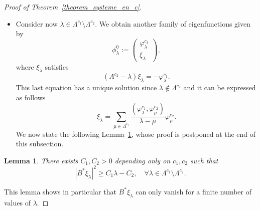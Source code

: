 \documentclass[11pt]{article}
\newtheorem{lemm}[theo]{Lemma}
\theoremstyle{definition}
\numberwithin{equation}{section}
\numberwithin{figure}{section}
\numberwithin{table}{section}
\newcommand{\fprop}[2]{\varphi^{#1}_{#2}}
\renewcommand{\cdot}{{\scriptstyle \bullet}}
\let\oldforall\forall
\renewcommand*{\forall}{\mathrel{\oldforall}}
\begin{document}
\begin{proof}[Proof of Theorem~\ref{theorem_systeme_en_c}]
\begin{itemize}
\begin{itemize}
\begin{itemize}
\item Assume now that $\beta_\lambda\neq 0$. In that case, $\lambda$ is geometrically simple but there exists a generalized eigenfunction $\phi_\lambda^1$ associated with $\phi_\lambda^0$ of the following form
\[
\phi_\lambda^1 := \frac{1}{\beta_\lambda}
\begin{pmatrix} \fprop{c_1}{\lambda} \\ \chi_\lambda
\end{pmatrix},
\]


where $\chi_\lambda$ is the unique solution of
\[
(A^{c_2} - \lambda) \chi_\lambda = \beta_\lambda \fprop{c_2}{\lambda} - \fprop{c_1}{\lambda},
\]
that satisfy $B^*\chi_\lambda=0$.

We can express $\chi_\lambda$ in the basis $\fprop{c_2}{\cdot}$ as follows
\[
\chi_\lambda=a_\lambda \fprop{c_2}{\lambda} - \sum_{\substack{\mu\in \Lambda^{c_2}\\ \mu \neq \lambda}} \frac{(\fprop{c_1}{\lambda},\fprop{c_2}{\mu})}{\lambda-\mu} \fprop{c_2}{\mu},
\]
with
\[
a_\lambda = \frac{1}{B^*\fprop{c_2}{\lambda}} \sum_{\substack{\mu\in \Lambda^{c_2}\\ \mu \neq \lambda}} \frac{(\fprop{c_1}{\lambda},\fprop{c_2}{\mu})}{\lambda-\mu} B^* \fprop{c_2}{\mu}.
\]
\end{itemize}
\end{itemize}
\item Consider now $\lambda\in \Lambda^{c_1}\setminus \Lambda^{c_2}$. We obtain another family of eigenfunctions given by
\begin{equation}\label{systeme_en_c_fp2}
\phi_\lambda^0 :=
\begin{pmatrix} \fprop{c_1}{\lambda} \\ \xi_\lambda
\end{pmatrix},
\end{equation}
where $\xi_\lambda$ satisfies
\[
(A^{c_2}-\lambda) \xi_\lambda = - \fprop{c_1}{\lambda}.
\]
This last equation has a unique solution since $\lambda\not\in \Lambda^{c_2}$ and it can be expressed as follows
\begin{equation}\label{def_xi_lambda}
\xi_\lambda = \sum_{\mu\in \Lambda^{c_2}} \frac{(\fprop{c_1}{\lambda},\fprop{c_2}{\mu})}{\lambda-\mu} \fprop{c_2}{\mu}.
\end{equation}
We now state the following Lemma~\ref{lemme_ABM}, whose proof is postponed at the end of this subsection.
\end{itemize}
\begin{lemm}\label{lemme_ABM}
There exists $C_1,C_2>0$ depending only on $c_1, c_2$ such that
\begin{equation}\label{ABM_xi_lambda}
|B^* \xi_\lambda|^2 \geq C_1 \lambda - C_2, \quad \forall \lambda\in \Lambda^{c_1}\setminus \Lambda^{c_2}.
\end{equation}
\end{lemm}
This lemma shows in particular that $B^* \xi_\lambda$ can only vanish for a finite number of values of $\lambda$.



\end{proof}
\end{document}
